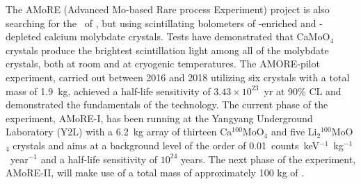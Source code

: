 The AMoRE \cite{Kim:2022uce} (Advanced Mo-based Rare process Experiment) project is also searching for the \bbonu\ of , but using scintillating bolometers of -enriched and -depleted calcium molybdate crystals. Tests have demonstrated that CaMoO$_4$ crystals produce the brightest scintillation light among all of the molybdate crystals, both at room and at cryogenic temperatures. The AMORE-pilot experiment, carried out between 2016 and 2018 utilizing six crystals with a total mass of 1.9~kg, achieved a half-life sensitivity of $3.43\times10^{23}$~yr at 90\% CL and demonstrated the fundamentals of the technology. The current phase of the experiment, AMoRE-I, has been running at the Yangyang Underground Laboratory (Y2L) with a 6.2~kg array of thirteen Ca$^{100}$MoO$_4$ and five Li$_2$$^{100}$MoO$_4$ crystals and aims at a background level of the order of 0.01~counts~keV$^{-1}$~kg$^{-1}$~year$^{-1}$ and a half-life sensitivity of $10^{24}$ years. The next phase of the experiment, AMoRE-II, will make use of a total mass of approximately 100 kg of .
